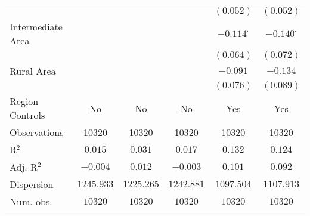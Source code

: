 \begin{center}
\begin{tiny}
\begin{longtable}{l@{} c@{} c@{} c@{} c@{} c@{}}
                                                      &                  &                  &                  & $(0.052)$        & $(0.052)$        \\
\quad Intermediate Area                               &                  &                  &                  & $-0.114^{\cdot}$ & $-0.140^{\cdot}$ \\
                                                      &                  &                  &                  & $(0.064)$        & $(0.072)$        \\
\quad Rural Area                                      &                  &                  &                  & $-0.091$         & $-0.134$         \\
                                                      &                  &                  &                  & $(0.076)$        & $(0.089)$        \\
\hline
Region Controls                                       & No               & No               & No               & Yes              & Yes              \\
Observations                                          & 10320            & 10320            & 10320            & 10320            & 10320            \\
R$^2$                                                 & $0.015$          & $0.031$          & $0.017$          & $0.132$          & $0.124$          \\
Adj. R$^2$                                            & $-0.004$         & $0.012$          & $-0.003$         & $0.101$          & $0.092$          \\
Dispersion                                            & $1245.933$       & $1225.265$       & $1242.881$       & $1097.504$       & $1107.913$       \\
Num. obs.                                             & $10320$          & $10320$          & $10320$          & $10320$          & $10320$          \\
\end{longtable}
\end{tiny}
\end{center}
